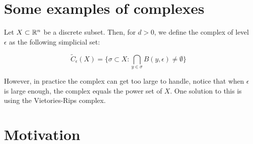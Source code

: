 \section{Some examples of complexes}

\begin{definition}

Let $X\subset \mathbb{R}^n$ be a discrete subset. Then, for $d>0$, we define the \Cech
complex of level $\epsilon$ as the following simplicial set:


$$
\tilde{C}_\epsilon(X)
=
\{
\sigma \subset X :
\bigcap_{y\in\sigma} B(y,\epsilon)\neq \emptyset
\}
$$

\end{definition}

However, in practice the {\Cech} complex can get too large to handle, notice that when $\epsilon$ is large enough,
the {\Cech} complex equals the power set of $X$. One solution to this is using the 
Vietories-Rips complex.

\begin{definition}

\end{definition}

\section{Motivation}



